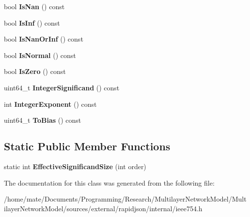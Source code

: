 \begin{DoxyCompactItemize}
\item 
bool {\bfseries Is\+Nan} () const \hypertarget{classinternal_1_1Double_a5c1ad93b8c866afdd5c2b412ef7bea98}{}\label{classinternal_1_1Double_a5c1ad93b8c866afdd5c2b412ef7bea98}

\item 
bool {\bfseries Is\+Inf} () const \hypertarget{classinternal_1_1Double_a2efab47ffbfa75e0fca1129263b86545}{}\label{classinternal_1_1Double_a2efab47ffbfa75e0fca1129263b86545}

\item 
bool {\bfseries Is\+Nan\+Or\+Inf} () const \hypertarget{classinternal_1_1Double_a5b5cc0b8552246f9e274b00a010bd676}{}\label{classinternal_1_1Double_a5b5cc0b8552246f9e274b00a010bd676}

\item 
bool {\bfseries Is\+Normal} () const \hypertarget{classinternal_1_1Double_ac34b7871eeb80d2b6bac48f144c97b51}{}\label{classinternal_1_1Double_ac34b7871eeb80d2b6bac48f144c97b51}

\item 
bool {\bfseries Is\+Zero} () const \hypertarget{classinternal_1_1Double_a6eb58f2690af582efeb9b76ef35c4c60}{}\label{classinternal_1_1Double_a6eb58f2690af582efeb9b76ef35c4c60}

\item 
uint64\+\_\+t {\bfseries Integer\+Significand} () const \hypertarget{classinternal_1_1Double_a96c5e0f06551e83565b5097950d30e32}{}\label{classinternal_1_1Double_a96c5e0f06551e83565b5097950d30e32}

\item 
int {\bfseries Integer\+Exponent} () const \hypertarget{classinternal_1_1Double_a8e16ee31d521fb56f0b98be427a9d47e}{}\label{classinternal_1_1Double_a8e16ee31d521fb56f0b98be427a9d47e}

\item 
uint64\+\_\+t {\bfseries To\+Bias} () const \hypertarget{classinternal_1_1Double_af8b543dc813f761d274824f7cef00a43}{}\label{classinternal_1_1Double_af8b543dc813f761d274824f7cef00a43}

\end{DoxyCompactItemize}
\subsection*{Static Public Member Functions}
\begin{DoxyCompactItemize}
\item 
static int {\bfseries Effective\+Significand\+Size} (int order)\hypertarget{classinternal_1_1Double_aa710fa4f5e06b0ff4348a13475688f13}{}\label{classinternal_1_1Double_aa710fa4f5e06b0ff4348a13475688f13}

\end{DoxyCompactItemize}


The documentation for this class was generated from the following file\+:\begin{DoxyCompactItemize}
\item 
/home/mate/\+Documents/\+Programming/\+Research/\+Multilayer\+Network\+Model/\+Multilayer\+Network\+Model/sources/external/rapidjson/internal/ieee754.\+h\end{DoxyCompactItemize}
